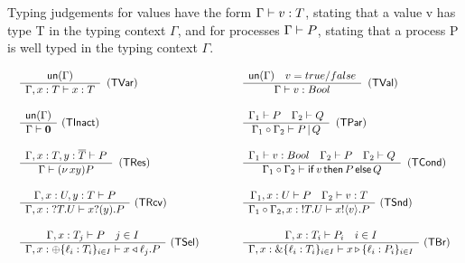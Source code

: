 Typing judgements for values have the form $\Gamma \mathrel{\vdash} v: T$, stating that a value v has type T in the typing context $\Gamma$, and for processes $\Gamma \mathrel{\vdash} P$, stating that a process P is well typed in the typing context $\Gamma$.
\begin{definition}
  \label{def:linear_typing}
  \vspace{-2mm}
  \[
  \begin{array}{ll}
  \tree{
    \un(\Gamma)
  }{
    \Gamma, x: T \types x: T
  }{}{\TVar}
  &
  \qquad
  \tree{
  \un(\Gamma)
  \andalso
    v = true / false
  }{
    \Gamma \types v: Bool
  }{}{\TVal}
  \\ \\
  \tree{
  \un(\Gamma)
  }{
  \Gamma \types \nil
  }{\TInact}
  &
  \qquad
  \tree{
  \Gamma_1 \types P
  \andalso
  \Gamma_2 \types Q
  }{
    \Gamma_1 \sessionop \Gamma_2 \types P \pll Q
  }{}{\TPar}
  \\ \\
   \tree{
     \Gamma, x: T, y: \tdual T \types P
   }{
     \Gamma \types \newn{xy} P
   }{}{\TRes}
   &
   \qquad
    \tree{
      \Gamma_1 \types v: Bool \andalso \Gamma_2 \types P \andalso \Gamma_2 \types Q
    }{
      \Gamma_1 \sessionop \Gamma_2 \types \cond{v}{P}{Q}
    }{}{\TCond}
    \\ \\
    \tree{
    \Gamma, x : U, y: T \types P
      }{
        \Gamma, x: \tin T U \types \pin{x}{y} P
      }{\TRcv}
    &
    \qquad
    \tree{
    \Gamma_1, x: U \types P
      \andalso
    \Gamma_2 \types v : T
    }{
    \Gamma_1 \sessionop \Gamma_2, x: \tout T U \types \pout{x}{v} P
    }{\TSnd}
  \\ \\
    \tree{
    \Gamma, x: T_j \types P \andalso j \in I
    }{
    \Gamma, x : \tselI{\ell}{T} \types \sel{x}{\ell_j} P
    }{\TSel}
    &
    \qquad
    \tree {
    \Gamma, x : T_i \types P_i \andalso i \in I
    }{
      \Gamma, x : \tbranchOn{\ell_i:T_i}_{i \in I} \types \branch{x}{\ell_i:P_i}_{i \in I}
    }{\TBr}
  \end{array}
  \]

\end{definition}


